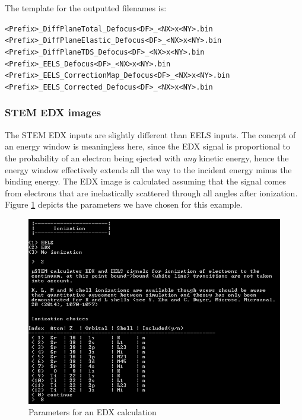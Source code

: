 \documentclass[12pt,a4paper]{article}
\newenvironment{myenv}{\begin{samepage}\begin{adjustwidth}{2cm}{}}{\end{adjustwidth}\end{samepage}}
\begin{document}
The template for the outputted filenames is:
%
\begin{myenv}
    \verb|<Prefix>_DiffPlaneTotal_Defocus<DF>_<NX>x<NY>.bin| \\
    \verb|<Prefix>_DiffPlaneElastic_Defocus<DF>_<NX>x<NY>.bin| \\
    \verb|<Prefix>_DiffPlaneTDS_Defocus<DF>_<NX>x<NY>.bin| \\
    \verb|<Prefix>_EELS_Defocus<DF>_<NX>x<NY>.bin| \\
    \verb|<Prefix>_EELS_CorrectionMap_Defocus<DF>_<NX>x<NY>.bin| \\
    \verb|<Prefix>_EELS_Corrected_Defocus<DF>_<NX>x<NY>.bin| \\
\end{myenv}
%

\subsubsection{STEM EDX images}

The STEM EDX inputs are slightly different than EELS inputs.
The concept of an energy window is meaningless here, since the EDX signal is proportional to the probability of an electron being ejected with \emph{any} kinetic energy, hence the energy window effectively extends all the way to the incident energy minus the binding energy.
The EDX image is calculated assuming that the signal comes from electrons that are inelastically scattered through all angles after ionization.
Figure \ref{fig:cb_abs_EDX} depicts the parameters we have chosen for this example.

\begin{figure}[!h]
\begin{center}
    \includegraphics[scale=0.75]{cb_abs_EDX.png}
\caption{Parameters for an EDX calculation}
\label{fig:cb_abs_EDX}
\end{center}
\end{figure}
\end{document}

